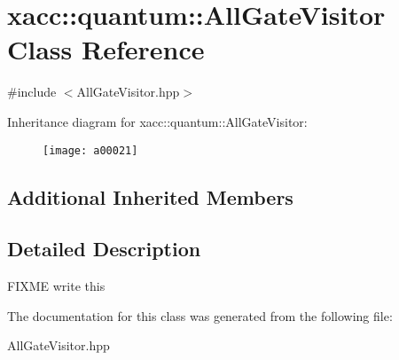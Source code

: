 \hypertarget{a00021}{}\section{xacc\+:\+:quantum\+:\+:All\+Gate\+Visitor Class Reference}
\label{a00021}


{\ttfamily \#include $<$All\+Gate\+Visitor.\+hpp$>$}

Inheritance diagram for xacc\+:\+:quantum\+:\+:All\+Gate\+Visitor\+:\begin{figure}[H]
\begin{center}
\leavevmode
\texttt{[image: a00021]}
\end{center}
\end{figure}
\subsection*{Additional Inherited Members}


\subsection{Detailed Description}
F\+I\+X\+ME write this 

The documentation for this class was generated from the following file\+:\begin{DoxyCompactItemize}
\item 
All\+Gate\+Visitor.\+hpp\end{DoxyCompactItemize}
